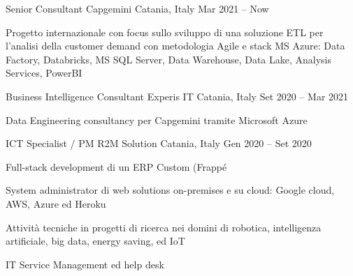 
  \begin{cventries}
    \cventry
    {Senior Consultant}
    {Capgemini}    
    {Catania, Italy}
    {Mar 2021 -- Now}
    {
      \begin{cvitems}
        \item {Progetto internazionale con focus sullo sviluppo di una soluzione ETL per l'analisi della customer demand con metodologia Agile e stack MS Azure: Data Factory, Databricks, MS SQL Server, Data Warehouse, Data Lake, Analysis Services, PowerBI
}
      \end{cvitems}
    }

    \cventry
    {Business Intelligence Consultant}
    {Experis IT}    
    {Catania, Italy}
    {Set 2020 -- Mar 2021}
    {
      \begin{cvitems}
        \item {Data Engineering consultancy per Capgemini tramite Microsoft Azure}
      \end{cvitems}
    }

    \cventry
    {ICT Specialist / PM}
    {R2M Solution}    
    {Catania, Italy}
    {Gen 2020 -- Set 2020}
    {
      \begin{cvitems}
        \item {Full-stack development di un ERP Custom (Frappé}
        \item {System administrator di web solutions on-premises e su cloud: Google cloud, AWS, Azure ed Heroku}
        \item {Attività tecniche in progetti di ricerca nei domini di robotica, intelligenza artificiale, big data, energy saving, ed IoT}
        \item {IT Service Management ed help desk}
      \end{cvitems}
    }


\end{cventries}
